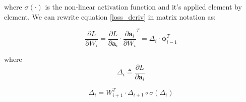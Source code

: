 \documentclass{article}
\renewcommand{\vec}[1]{\boldsymbol{#1}}
\begin{document}
where $\sigma(\cdot)$ is the non-linear activation function and it's applied element by element.
We can rewrite equation \ref{loss_deriv} in matrix notation as:

\begin{equation}
 \frac{\partial L}{\partial W_i} = \frac{\partial L}{\partial \vec{a}_{i}} \cdot\frac{\partial \vec{a}_{i}}{\partial W_i}^T =
 \Delta_i \cdot \vec{\phi}_{i-1}^T
\end{equation}

where
\begin{equation}
\Delta_i  \triangleq  \frac{\partial L}{\partial \vec{a}_{i}} 
\end{equation}

\begin{equation}
 \Delta_i = W_{i+1}^T \cdot \Delta_{i+1} \circ \sigma(\Delta_i)
\end{equation}




\newpage
{}

\end{document}
